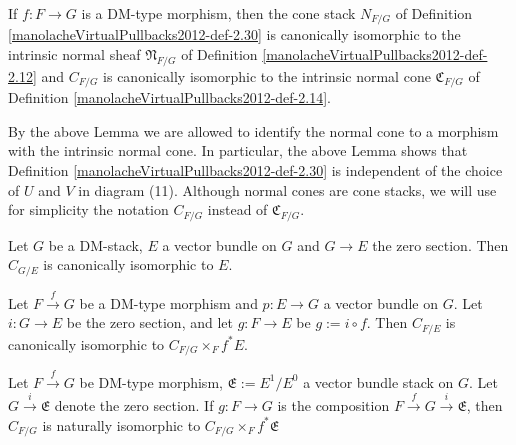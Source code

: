 \begin{proposition}\label{manolacheVirtualPullbacks2012-prop-2.33}
\label{manolacheVirtualPullbacks2012-inc}
 If $f: F\to G$ is a DM-type morphism, then the cone stack $N_{F/G}$ of Definition \ref{manolacheVirtualPullbacks2012-def-2.30} is canonically isomorphic to the intrinsic normal sheaf $\mathfrak{N}_{F/G}$ of Definition \ref{manolacheVirtualPullbacks2012-def-2.12} and $C_{F/G}$ is canonically isomorphic to the intrinsic normal cone $\mathfrak{C}_{F/G}$ of Definition \ref{manolacheVirtualPullbacks2012-def-2.14}.
\end{proposition}

\begin{remark}\label{manolacheVirtualPullbacks2012-rem-2.34}
 By the above Lemma we are allowed to identify the normal cone to a morphism with the intrinsic normal cone. In particular, the above Lemma shows that Definition \ref{manolacheVirtualPullbacks2012-def-2.30} is independent of the choice of $U$ and $V$ in diagram (11). Although normal cones are cone stacks, we will use for simplicity the notation $C_{F/G}$ instead of $\mathfrak{C}_{F/G}$.
\end{remark}

\begin{example}\label{manolacheVirtualPullbacks2012-ex-2.35}
Let $G$ be a DM-stack, $E$ a vector bundle on $G$ and $G\to E$ the zero section. Then $C_{G/E}$ is canonically isomorphic to $E$.
\end{example}

\begin{example}\label{manolacheVirtualPullbacks2012-ex-2.36}
Let $F\stackrel{f}\rightarrow G$ be a DM-type morphism and $p:E\to G$ a vector bundle on $G$. Let $i:G\to E$ be the zero section, and let $g:F\to E$ be $g:=i\circ f$. Then $C_{F/E}$ is canonically isomorphic to $C_{F/G}\times_Ff^*E$.
\end{example}

\begin{example}\label{manolacheVirtualPullbacks2012-ex-2.37}
\label{manolacheVirtualPullbacks2012-vb}Let $F\stackrel{f}\rightarrow G$ be DM-type morphism, $\mathfrak{E}:=E^1/E^0$ a vector bundle stack on $G$. Let $G\stackrel{i}{\rightarrow}\mathfrak{E}$ denote the zero section. If $g:F\to G $ is the composition $F\stackrel{f}{\rightarrow}G\stackrel{i}{\rightarrow}\mathfrak{E}$, then $C_{F/G}$ is naturally isomorphic to $C_{F/G}\times_Ff^*\mathfrak{E}$
\end{example}

